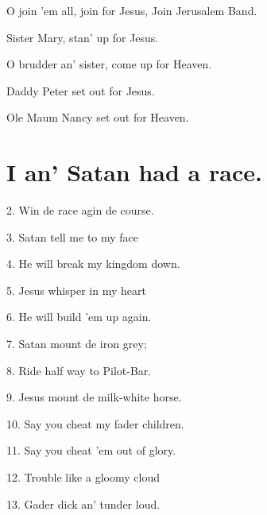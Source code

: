 \documentclass[a5paper,10pt]{book}
\begin{document}
\begin{stanza}
\item[]
  O join 'em all, join for Jesus, Join Jerusalem Band.
\item[]
  Sister Mary, stan' up for Jesus.
\item[]
  O brudder an' sister, come up for Heaven.
\item[]
  Daddy Peter set out for Jesus.
\item[]
  Ole Maum Nancy set out for Heaven.
\end{stanza}

\begin{extra}
\end{extra}


\newpage
\section{I an' Satan had a race.}
\thispagestyle{empty}

\begin{song}
\end{song}

\begin{stanza}
\item[2.]
  Win de race agin de course.
\item[3.]
  Satan tell me to my face
\item[4.]
  He will break my kingdom down.
\item[5.]
  Jesus whisper in my heart
\item[6.]
  He will build 'em up again.
\item[7.]
  Satan mount de iron grey;
\item[8.]
  Ride half way to Pilot-Bar.
\item[9.]
  Jesus mount de milk-white horse.
\item[10.]
  Say you cheat my fader children.
\item[11.]
  Say you cheat 'em out of glory.
\item[12.]
  Trouble like a gloomy cloud
\item[13.]
  Gader dick an' tunder loud.
\end{stanza}
\end{document}
